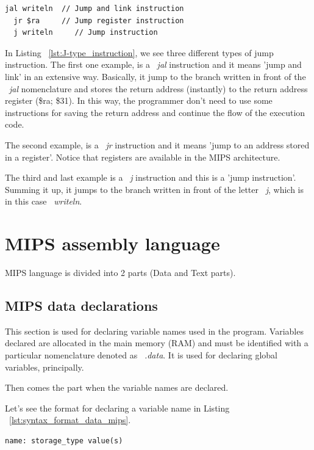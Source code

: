 \documentclass[
  oneside,
  11pt, a4paper,
  footinclude=true,
  headinclude=true,
  cleardoublepage=empty
]{scrbook}
\begin{document}
\begin{lstlisting}[caption={Examples of J-Type instruction},label={lst:J-type_instruction}]
  jal writeln  // Jump and link instruction
  jr $ra	 // Jump register instruction
  j writeln     // Jump instruction
\end{lstlisting}

In Listing ~\ref{lst:J-type_instruction}, we see three different types of jump instruction.
The first one example, is a ~\textit{jal} instruction and it means 'jump and link' in an extensive way. Basically, it jump to the branch written in front of the ~\textit{jal} nomenclature and stores the return address (instantly) to the return address register (\$ra; \$31). In this way, the programmer don't need to use some instructions for saving the return address and continue the flow of the execution code.

The second example, is a ~\textit{jr} instruction and it means 'jump to an address stored in a register'. Notice that registers are available in the MIPS architecture.

The third and last example is a ~\textit{j} instruction and this is a 'jump instruction'. Summing it up, it jumps to the branch written in front of the letter ~\textit{j}, which is in this case ~\textit{writeln}.



\section{MIPS assembly language}

MIPS language is divided into 2 parts (Data and Text parts).

\subsection{MIPS data declarations}

This section is used for declaring variable names used in the program.
Variables declared are allocated in the main memory (RAM) and must be identified with a particular nomenclature denoted as ~\textit{.data}. It is used for declaring global variables, principally.

Then comes the part when the variable names are declared.

Let's see the format for declaring a variable name in Listing ~\ref{lst:syntax_format_data_mips}.

\begin{lstlisting}[caption={Syntax format of data declarations in MIPS},label={lst:syntax_format_data_mips}]
  name: storage_type value(s)
\end{lstlisting}
\end{document}

